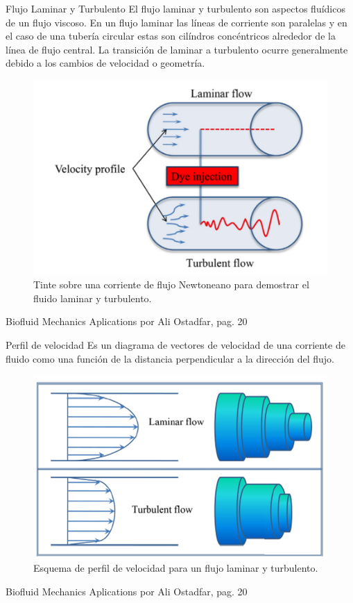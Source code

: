 \begin{frame}{Flujo Laminar y Turbulento}
\justifying
El flujo laminar y turbulento son aspectos fluídicos de un flujo viscoso. En un flujo laminar las líneas de corriente son paralelas y en el caso de una tubería circular estas son cilíndros concéntricos alrededor de la línea de flujo central.
La transición de laminar a turbulento ocurre generalmente debido a los cambios de velocidad o geometría.
\begin{figure}[H]
\centering
\includegraphics[scale=0.4]{Section_Files/S2-imagenes-Manuel/02.png}
\caption{Tinte sobre una corriente de flujo Newtoneano para demostrar el fluido laminar y turbulento.}
\end{figure}
{\tiny Biofluid Mechanics Aplications por Ali Ostadfar, pag. 20}
\end{frame}

\begin{frame}{Perfil de velocidad}
\justifying
Es un diagrama de vectores de velocidad de una corriente de fluido como una función de la distancia perpendicular a la dirección del flujo.
\begin{figure}[H]
\centering
\includegraphics[scale=0.4]{Section_Files/S2-imagenes-Manuel/03.png}
\caption{Esquema de perfil de velocidad para un flujo laminar y turbulento.}
\end{figure}
{\tiny Biofluid Mechanics Aplications por Ali Ostadfar, pag. 20}
\end{frame}

